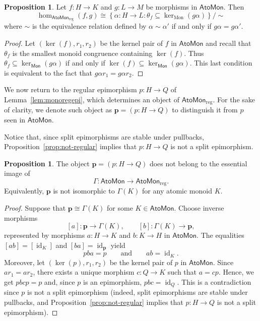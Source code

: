 \documentclass[a4paper,10pt,reqno]{amsart}
\theoremstyle{definition}
\newtheorem{proposition}[theorem]{Proposition}
\theoremstyle{remark}
\newcommand{\AtoMon}{\mathsf{AtoMon}}
\newcommand{\Mon}{\mathsf{Mon}}
\begin{document}
\begin{proposition}
\label{prop:hom-regular-completion-theta}
Let $f\colon H\to K$ and $g\colon L\to M$ be morphisms in $\AtoMon$. Then
$$
\operatorname{hom}_{\AtoMon_{\mathrm{reg}}}(f,g)
\cong
\left\{
\alpha\colon H\to L:
\theta_f\subseteq\ker_{\mathrm{Mon}}(g\alpha)
\right\}/ \sim
$$
where $\sim$ is the equivalence relation defined by $\alpha\sim\alpha'$ if and only if $g\alpha=g\alpha'$.
\end{proposition}

\begin{proof}
Let $(\ker(f),r_1,r_2)$ be the kernel pair of $f$ in $\AtoMon$ and recall that $\theta_f$ is the smallest monoid congruence containing $\ker(f)$. Thus $\theta_f \subseteq \ker_\Mon(g\alpha)$ if and only if $\ker(f)\subseteq \ker_\Mon(g\alpha)$. This last condition is equivalent to the fact that $g\alpha r_1=g\alpha r_2$.
\end{proof}

We now return to the regular epimorphism $p\colon H\to Q$ of Lemma~\ref{lem:monoregepi}, which determines an object of $\AtoMon_{\mathrm{reg}}$. For the sake of clarity, we denote such object as $\mathbf p=(p\colon H\to Q)$ to distinguish it from $p$ seen in $\AtoMon$.

Notice that, since split epimorphisms are stable under pullbacks, Proposition~\ref{prop:not-regular} implies that $p\colon H \to Q$ is not a split epimorphism.

\begin{proposition}
\label{prop:p-not-in-essential-image}
The object $\mathbf p=(p\colon H\to Q)$ does not belong to the essential
image of
$$
    \Gamma\colon
    \AtoMon\to\AtoMon_{\mathrm{reg}}.
$$
Equivalently, $\mathbf p$ is not isomorphic to $\Gamma(K)$ for any atomic
monoid $K$.
\end{proposition}

\begin{proof}
Suppose that $\mathbf p\cong\Gamma(K)$ for some $K\in\AtoMon$.
Choose inverse morphisms
$$
    [a]\colon\mathbf p\to\Gamma(K),
    \qquad
    [b]\colon\Gamma(K)\to\mathbf p,
$$
represented by morphisms $a\colon H\to K$ and $b\colon K\to H$ in $\AtoMon$.
The equalities $[ab]=[\operatorname{id}_K]$ and $[ba]=\operatorname{id}_\mathbf{p}$ yield
$$
pba=p \qquad \text{and} \qquad ab=\operatorname{id}_K.
$$
Moreover, let $(\ker(p),r_1,r_2)$ be the kernel pair of $p$ in $\AtoMon$. Since $ar_1=ar_2$, there exists a unique morphism $c\colon Q \to K$ such that $a=cp$. Hence, we get $pbcp=p$ and, since $p$ is an epimorphism, $pbc=\operatorname{id}_Q$. This is a contradiction since $p$ is not a split epimorphism (indeed, split epimorphisms are stable under pullbacks, and Proposition~\ref{prop:not-regular} implies that $p\colon H \to Q$ is not a split epimorphism).
\end{proof}
\end{document}
